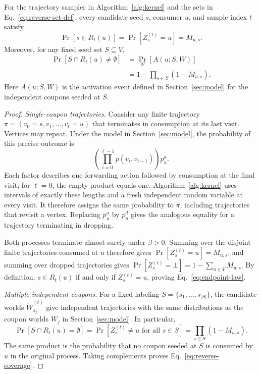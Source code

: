 \documentclass[sigconf]{acmart}
\begin{document}
\begin{theorem}
\label{thm:probability-equivalence}
For the trajectory sampler in Algorithm~\ref{alg:kernel} and the
sets in Eq.~\eqref{eq:reverse-set-def}, every candidate seed $s$,
consumer $u$, and sample index $t$ satisfy
\begin{equation}
\label{eq:endpoint-law}
 \Pr[s\in R_t(u)]=\Pr[Z_s^{(t)}=u]=M_{u,s}.
\end{equation}
Moreover, for any fixed seed set $S\subseteq V$,
\begin{equation}
\label{eq:reverse-coverage}
 \begin{aligned}
 \Pr[S\cap R_t(u)\ne\emptyset]
 &=\Pr_W[A(u;S,W)]\\
 &=1-\prod_{s\in S}(1-M_{u,s}).
 \end{aligned}
\end{equation}
Here $A(u;S,W)$ is the activation event defined in
Section~\ref{sec:model} for the independent coupons seeded at $S$.
\end{theorem}
\begin{proof}\renewcommand{\qedsymbol}{}
\emph{Single-coupon trajectories.}
Consider any finite trajectory
$\pi=(v_0=s,v_1,\ldots,v_\ell=u)$ that terminates in consumption
at its last visit. Vertices may repeat. Under the model in
Section~\ref{sec:model}, the probability of this precise outcome is
\begin{equation}
\label{eq:trajectory-probability}
 \left(\prod_{i=0}^{\ell-1}p(v_i,v_{i+1})\right)p_u^a.
\end{equation}
Each factor describes one forwarding action followed by consumption
at the final visit; for $\ell=0$, the empty product equals one.
Algorithm~\ref{alg:kernel} uses intervals of exactly these lengths
and a fresh independent random variable at every visit. It therefore
assigns the same probability to $\pi$, including trajectories that
revisit a vertex. Replacing $p_u^a$ by $p_u^d$ gives the analogous
equality for a trajectory terminating in dropping.

Both processes terminate almost surely under $\beta>0$.
Summing over the disjoint finite trajectories consumed at $u$
therefore gives $\Pr[Z_s^{(t)}=u]=M_{u,s}$, and summing over
dropped trajectories gives
$\Pr[Z_s^{(t)}=\bot]=1-\sum_{u\in V}M_{u,s}$.
By definition, $s\in R_t(u)$ if and only if $Z_s^{(t)}=u$,
proving Eq.~\eqref{eq:endpoint-law}.

\emph{Multiple independent coupons.}
For a fixed labeling $S=\{s_1,\ldots,s_{|S|}\}$, the candidate
worlds $\widetilde W_{s_j}^{(t)}$ give independent trajectories
with the same distributions as the coupon worlds $W_j$ in
Section~\ref{sec:model}. In particular,
\[
 \Pr[S\cap R_t(u)=\emptyset]
 =\Pr[Z_s^{(t)}\ne u\text{ for all }s\in S]
 =\prod_{s\in S}(1-M_{u,s}).
\]
The same product is the probability that no coupon seeded at $S$
is consumed by $u$ in the original process. Taking complements
proves Eq.~\eqref{eq:reverse-coverage}.
\end{proof}
\end{document}
